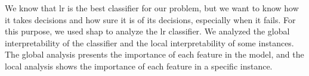 We know that \acl{lr} is the best classifier for our problem, but we want to know how it takes decisions and how sure it is of its decisions, especially when it fails. For this purpose, we used \ac{shap} to analyze the \ac{lr} classifier. We analyzed the global interpretability of the classifier and the local interpretability of some instances. The global analysis presents the importance of each feature in the model, and the local analysis shows the importance of each feature in a specific instance.